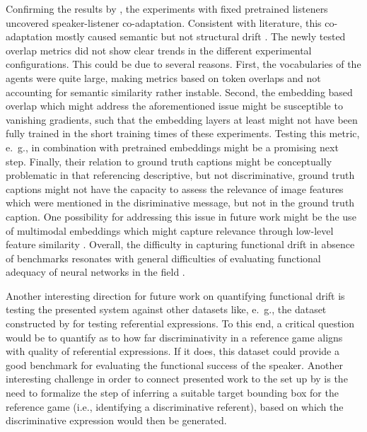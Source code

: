Confirming the results by \cite{lazaridou2020multi}, the experiments with fixed pretrained listeners uncovered speaker-listener co-adaptation. Consistent with literature, this co-adaptation mostly caused semantic but not structural drift \parencite[cf.][]{lee2019countering}. 
The newly tested overlap metrics did not show clear trends in the different experimental configurations.  This could be due to several reasons. First, the vocabularies of the agents were quite large, making metrics based on token overlaps and not accounting for semantic similarity rather instable. Second, the embedding based overlap which might address the aforementioned issue might be susceptible to vanishing gradients, such that the embedding layers at least might not have been fully trained in the short training times of these experiments. Testing this metric, e.~g., in combination with pretrained embeddings might be a promising next step. Finally, their relation to ground truth captions might be conceptually problematic in that referencing descriptive, but not discriminative, ground truth captions might not have the capacity to assess the relevance of image features which were mentioned in the disriminative message, but not in the ground truth caption. One possibility for addressing this issue in future work might be the use of multimodal embeddings which might capture relevance through low-level feature similarity \parencite[cf.][]{bruni2014multimodal}. Overall, the difficulty in capturing functional drift in absence of benchmarks resonates with general difficulties of evaluating functional adequacy of neural networks in the field \parencite[as noted, e.~g., by][]{kreiss2022context, mccoy2019right}.

Another interesting direction for future work on quantifying functional drift is testing the presented system against other datasets like, e.~g., the dataset constructed by \cite{mao2016generation} for testing referential expressions. To this end, a critical question would be to quantify as to how far discriminativity in a reference game aligns with quality of referential expressions. If it does, this dataset could provide a good benchmark for evaluating the functional success of the speaker. Another interesting challenge in order to connect presented work to the set up by \cite{mao2016generation} is the need to formalize the step of inferring a suitable target bounding box for the reference game (i.e., identifying a discriminative referent), based on which the discriminative expression would then be generated. 

